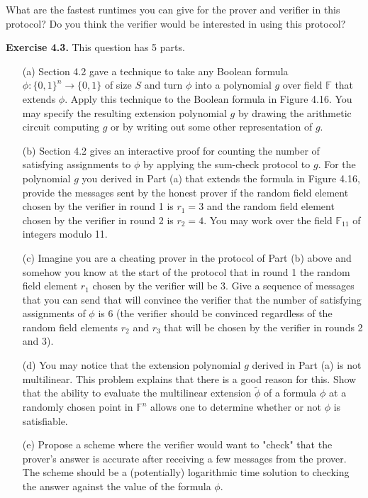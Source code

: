 \documentclass{article}
\begin{document}
What are the fastest runtimes you can give for the prover and verifier in this protocol? Do you think the verifier would be interested in using this protocol?

\textbf{Exercise 4.3.} This question has 5 parts.

\begin{itemize}
    \item[(a)] Section 4.2 gave a technique to take any Boolean formula $\phi:\{0,1\}^n \rightarrow \{0,1\}$ of size $S$ and turn $\phi$ into a polynomial $g$ over field $\mathbb{F}$ that extends $\phi$. Apply this technique to the Boolean formula in Figure 4.16. You may specify the resulting extension polynomial $g$ by drawing the arithmetic circuit computing $g$ or by writing out some other representation of $g$.
    
    \item[(b)] Section 4.2 gives an interactive proof for counting the number of satisfying assignments to $\phi$ by applying the sum-check protocol to $g$. For the polynomial $g$ you derived in Part (a) that extends the formula in Figure 4.16, provide the messages sent by the honest prover if the random field element chosen by the verifier in round 1 is $r_1 = 3$ and the random field element chosen by the verifier in round 2 is $r_2 = 4$. You may work over the field $\mathbb{F}_{11}$ of integers modulo 11.
    
    \item[(c)] Imagine you are a cheating prover in the protocol of Part (b) above and somehow you know at the start of the protocol that in round 1 the random field element $r_1$ chosen by the verifier will be 3. Give a sequence of messages that you can send that will convince the verifier that the number of satisfying assignments of $\phi$ is 6 (the verifier should be convinced regardless of the random field elements $r_2$ and $r_3$ that will be chosen by the verifier in rounds 2 and 3).
    
    \item[(d)] You may notice that the extension polynomial $g$ derived in Part (a) is not multilinear. This problem explains that there is a good reason for this. Show that the ability to evaluate the multilinear extension $\tilde{\phi}$ of a formula $\phi$ at a randomly chosen point in $\mathbb{F}^n$ allows one to determine whether or not $\phi$ is satisfiable.
    
    \item[(e)] Propose a scheme where the verifier would want to "check" that the prover's answer is accurate after receiving a few messages from the prover. The scheme should be a (potentially) logarithmic time solution to checking the answer against the value of the formula $\phi$.
\end{itemize}
\end{document}

